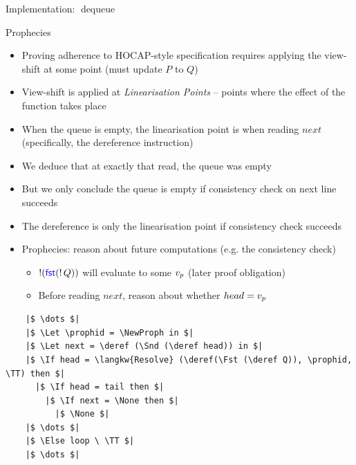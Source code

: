 \documentclass[9pt]{beamer}
\newcommand{\dequeue}{\operatorname{dequeue}}
\newcommand{\locN}[1]{\loc_{\mathrm{#1}}}
\newcommand{\lochead}{\locN{head}}
\newcommand{\loctail}{\locN{tail}}
\newcommand{\node}{x}
\newcommand{\prophval}{\val_p}
\begin{document}
\begin{frame}[fragile]{Implementation: $\dequeue$}
\begin{center}
{
    }
    \end{center}
\end{frame}

\begin{frame}[fragile]{Prophecies}
  \begin{itemize}
    \item Proving adherence to HOCAP-style specification requires applying the view-shift at some point (must update $P$ to $Q$)
    \item View-shift is applied at \textit{Linearisation Points} -- points where the effect of the function takes place
    \item When the queue is empty, the linearisation point is when reading $next$ (specifically, the dereference instruction)
    \item We deduce that at exactly that read, the queue was empty
    \item But we only conclude the queue is empty if consistency check on next line succeeds
    \item The dereference is only the linearisation point if consistency check succeeds
    \item Prophecies: reason about future computations (e.g. the consistency check)
      \begin{itemize}
        \item $\mathop{!}(\operatorname{\textsf{\color{blue} fst}} (\mathop{!} Q))$ will evaluate to some $\prophval$ (later proof obligation)
        \item Before reading $next$, reason about whether $head = \prophval$
      \end{itemize}
  \end{itemize}
  \vspace{-8pt}
  \begin{verbatim}
    |$ \dots $|
    |$ \Let \prophid = \NewProph in $|
    |$ \Let next = \deref (\Snd (\deref head)) in $|
    |$ \If head = \langkw{Resolve} (\deref(\Fst (\deref Q)), \prophid, \TT) then $|
      |$ \If head = tail then $|
        |$ \If next = \None then $|
          |$ \None $|
    |$ \dots $|
    |$ \Else loop \ \TT $|
    |$ \dots $|
  \end{verbatim}
\end{frame}
\end{document}
